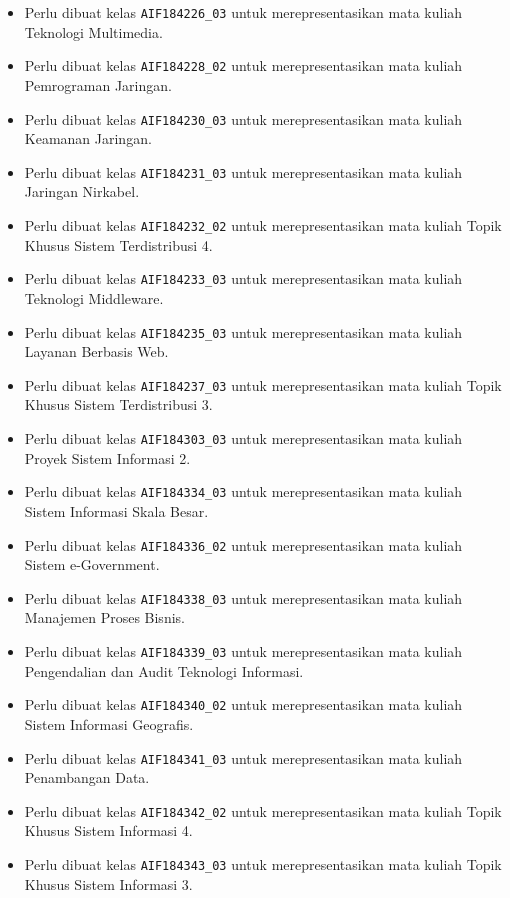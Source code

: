 \begin{enumerate}
\begin{itemize}
		\item Perlu dibuat kelas \texttt{AIF184226\_03} untuk merepresentasikan mata kuliah Teknologi Multimedia.
		\item Perlu dibuat kelas \texttt{AIF184228\_02} untuk merepresentasikan mata kuliah Pemrograman Jaringan.
		\item Perlu dibuat kelas \texttt{AIF184230\_03} untuk merepresentasikan mata kuliah Keamanan Jaringan.
		\item Perlu dibuat kelas \texttt{AIF184231\_03} untuk merepresentasikan mata kuliah Jaringan Nirkabel.
		\item Perlu dibuat kelas \texttt{AIF184232\_02} untuk merepresentasikan mata kuliah Topik Khusus Sistem Terdistribusi 4.
		\item Perlu dibuat kelas \texttt{AIF184233\_03} untuk merepresentasikan mata kuliah Teknologi Middleware.
		\item Perlu dibuat kelas \texttt{AIF184235\_03} untuk merepresentasikan mata kuliah Layanan Berbasis Web.
		\item Perlu dibuat kelas \texttt{AIF184237\_03} untuk merepresentasikan mata kuliah Topik Khusus Sistem Terdistribusi 3.
		\item Perlu dibuat kelas \texttt{AIF184303\_03} untuk merepresentasikan mata kuliah Proyek Sistem Informasi 2.
		\item Perlu dibuat kelas \texttt{AIF184334\_03} untuk merepresentasikan mata kuliah Sistem Informasi Skala Besar.
		\item Perlu dibuat kelas \texttt{AIF184336\_02} untuk merepresentasikan mata kuliah Sistem e-Government.
		\item Perlu dibuat kelas \texttt{AIF184338\_03} untuk merepresentasikan mata kuliah Manajemen Proses Bisnis.
		\item Perlu dibuat kelas \texttt{AIF184339\_03} untuk merepresentasikan mata kuliah Pengendalian dan Audit Teknologi Informasi.
		\item Perlu dibuat kelas \texttt{AIF184340\_02} untuk merepresentasikan mata kuliah Sistem Informasi Geografis.
		\item Perlu dibuat kelas \texttt{AIF184341\_03} untuk merepresentasikan mata kuliah Penambangan Data.
		\item Perlu dibuat kelas \texttt{AIF184342\_02} untuk merepresentasikan mata kuliah Topik Khusus Sistem Informasi 4.
		\item Perlu dibuat kelas \texttt{AIF184343\_03} untuk merepresentasikan mata kuliah Topik Khusus Sistem Informasi 3.

\end{itemize}
\end{enumerate}
